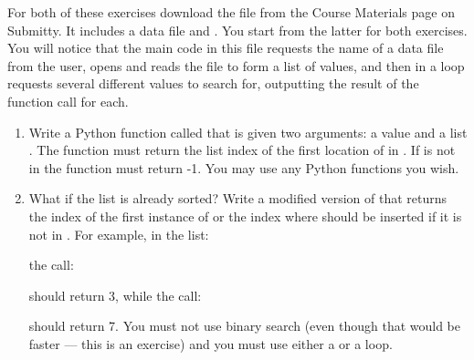 \documentclass[letterpaper,10pt,english]{sphinxmanual}
\begin{document}
For both of these exercises download the file  from
the Course Materials page on Submitty. It includes a data file and
. You start from the latter for both exercises.
You will notice that the main code in this file requests the name of a
data file from the user, opens and reads the file to form a list of
values, and then in a loop requests several different values to search
for, outputting the result of the function call for each.
\begin{enumerate}
\def\theenumi{\arabic{enumi}}
\def\labelenumi{\theenumi .}
\makeatletter\def\p@enumii{\p@enumi \theenumi .}\makeatother
\item {} 
Write a Python function called  that is given two
arguments:  a value  and a list . The function must
return the list index of the first location of  in .  If
 is not in  the function must return -1.  You may use any
Python  functions you wish.

\item {} 
What if the list is already sorted? Write a modified version of
 that returns the index of the first instance of
 or the index where  should be inserted if it is not in
. For example, in the list:

\begin{sphinxVerbatim}[commandchars=\\\{\}]
  \PYG{p}{[}      \PYG{p}{]}
\end{sphinxVerbatim}

the call:

\begin{sphinxVerbatim}[commandchars=\\\{\}]
 
\end{sphinxVerbatim}

should return 3, while the call:

\begin{sphinxVerbatim}[commandchars=\\\{\}]
 
\end{sphinxVerbatim}

should return 7. You must not use binary search (even though that
would be faster — this is an exercise) and you must use either a
 or a  loop.

\end{enumerate}
\end{document}
